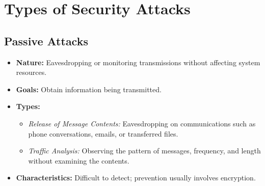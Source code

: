 \section{Types of Security Attacks}

\subsection{Passive Attacks}
\begin{itemize}
    \item \textbf{Nature:} Eavesdropping or monitoring transmissions without affecting system resources.
    \item \textbf{Goals:} Obtain information being transmitted.
    \item \textbf{Types:}
    \begin{itemize}
        \item \textit{Release of Message Contents:} Eavesdropping on communications such as phone conversations, emails, or transferred files.
        \item \textit{Traffic Analysis:} Observing the pattern of messages, frequency, and length without examining the contents.
    \end{itemize}
    \item \textbf{Characteristics:} Difficult to detect; prevention usually involves encryption.
\end{itemize}


